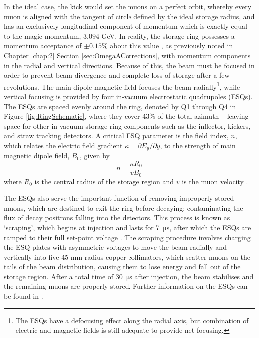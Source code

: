 In the ideal case, the kick would set the muons on a perfect orbit, whereby every muon is aligned with the tangent of circle defined by the ideal storage radius, and has an exclusively longitudinal component of momentum which is exactly equal to the magic momentum, $3.094$ GeV. In reality, the storage ring possesses a momentum acceptance of $\pm0.15$\% about this value \cite{BeamDynamics}, as previously noted in Chapter \ref{chap:2} Section \ref{sec:OmegaACorrections}, with momentum components in the radial and vertical directions. Because of this, the beam must be focused in order to prevent beam divergence and complete loss of storage after a few revolutions. The main dipole magnetic field focuses the beam radially\footnote{The ESQs have a defocusing effect along the radial axis, but combination of electric and magnetic fields is still adequate to provide net focusing.}, while vertical focusing is provided by four in-vacuum electrostatic quadrupoles (ESQs). The ESQs are spaced evenly around the ring, denoted by Q1 through Q4 in Figure \ref{fig:RingSchematic}, where they cover 43\% of the total azimuth --  leaving space for other in-vacuum storage ring components such as the inflector, kickers, and straw tracking detectors. A critical ESQ parameter is the field index, $n$, which relates the electric field gradient $\kappa = \partial E_{y} / \partial y$, to the strength of main magnetic dipole field, $B_{0}$, given by
%
\begin{equation}
  n = \frac{\kappa R_{0}}{v B_{0}} %
  \label{eqn:FieldIndex}
\end{equation}
where $R_{0}$ is the central radius of the storage region and $v$ is the muon velocity \cite{TDR}. %

The ESQs also serve the important function of removing improperly stored muons, which are destined to exit the ring before decaying: contaminating the flux of decay positrons falling into the detectors. This process is known as `scraping', which begins at injection and lasts for \SI{7}{\micro\second}, after which the ESQs are ramped to their full set-point voltage \cite{BeamDynamics}. The scraping procedure involves charging the ESQ plates with asymmetric voltages to move the beam radially and vertically into five 45 mm radius copper collimators, which scatter muons on the tails of the beam distribution, causing them to lose energy and fall out of the storage region. After a total time of \SI{30}{\micro\second} after injection, the beam stabilises and the remaining muons are properly stored. Further information on the ESQs can be found in \cite{TDR}.

